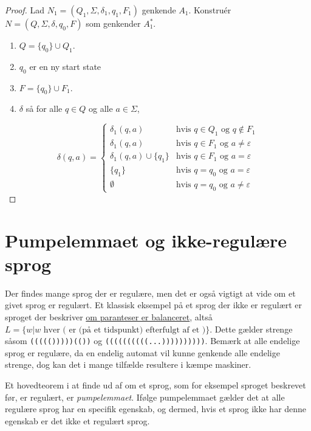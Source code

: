 \begin{proof}
	Lad $N_1 = (Q_1, \Sigma, \delta_1, q_1, F_1)$ genkende $A_1$.
	Konstruér $N = (Q, \Sigma, \delta, q_0, F)$ som genkender $A_1^*$.

	\begin{enumerate}
		\item $Q = \{q_0\} \cup Q_1$.
		\item $q_{0}$ er en ny start state
		\item $F = \{q_0\} \cup F_1$.
		\item  $\delta$ så for alle $q \in Q$ og alle $a \in \Sigma$,
	\end{enumerate}
	\[
		\delta(q, a) = \begin{cases}
			\delta_1(q, a)              & \text{hvis } q \in Q_1 \text{ og } q \notin F_1       \\
			\delta_1(q, a)              & \text{hvis } q \in F_1 \text{ og } a \neq \varepsilon \\
			\delta_1(q, a) \cup \{q_1\} & \text{hvis } q \in F_1 \text{ og } a = \varepsilon    \\
			\{q_1\}                     & \text{hvis } q = q_0 \text{ og } a = \varepsilon      \\
			\emptyset                   & \text{hvis } q = q_0 \text{ og } a \neq \varepsilon
		\end{cases}
	\]
\end{proof}

\newpage
\section{Pumpelemmaet og ikke-regulære sprog}

Der findes mange sprog der er regulære, men det er også vigtigt at vide om et givet sprog er regulært. Et klassisk eksempel på et sprog der ikke er regulært er sproget der beskriver \href{https://www.hackerrank.com/challenges/balanced-brackets/problem}{om paranteser er balanceret}, altså $L = \{w | w \text{ hver ( er (på et tidspunkt) efterfulgt af et )}\}$. Dette gælder strenge såsom \texttt{((((()))))(())} og \texttt{((((((((((...))))))))))}. Bemærk at alle endelige sprog er regulære, da en endelig automat vil kunne genkende alle endelige strenge, dog kan det i mange tilfælde resultere i kæmpe maskiner.

Et hovedteorem i at finde ud af om et sprog, som for eksempel sproget beskrevet før, er regulært, er \textit{pumpelemmaet}. Ifølge pumpelemmaet gælder det at alle regulære sprog har en specifik egenskab, og dermed, hvis et sprog ikke har denne egenskab er det ikke et regulært sprog.

